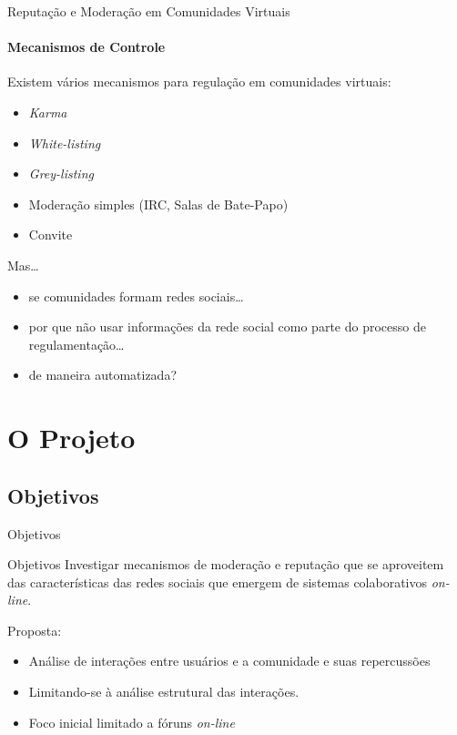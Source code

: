 \documentclass[compress]{beamer}
\begin{document}
    \begin{frame}{Reputação e Moderação em Comunidades Virtuais}
    \framesubtitle{Mecanismos de Controle}

        Existem vários mecanismos para regulação em comunidades
        virtuais:
        \begin{itemize}
            \item \emph{Karma}
            \item \emph{White-listing}
            \item \emph{Grey-listing}
            \item Moderação simples (IRC, Salas de Bate-Papo)
            \item Convite
        \end{itemize}
        \pause

        Mas\ldots\pause
        \begin{itemize}[<|+->]
            \item se comunidades formam \alert{redes sociais}\ldots

            \item por que não usar \alert{informações da rede social} como parte
            do processo de \alert{regulamentação}\ldots

            \item de maneira \alert{automatizada}?
        \end{itemize}
    \end{frame}

\section{O Projeto}
\subsection{Objetivos}

    \begin{frame}{Objetivos}
	\begin{block}{Objetivos}
            Investigar mecanismos de \alert{moderação e reputação} que
            se aproveitem das características das \alert{redes sociais}
            que emergem de sistemas colaborativos \emph{on-line}.
	\end{block}
        \vspace{1em}
	\pause

        Proposta:
        \begin{itemize}
            \item Análise de \alert{interações} entre usuários e a comunidade e
            suas repercussões

	    \item Limitando-se à \alert{análise estrutural} das interações.

            \item Foco inicial limitado a fóruns \emph{on-line}
        \end{itemize}
    \end{frame}
\end{document}
